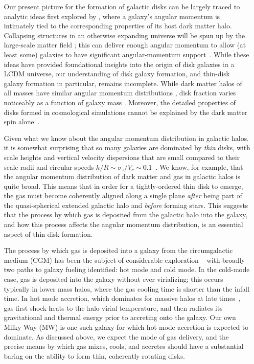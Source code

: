 \documentclass[fleqn,usenatbib]{mnras}
\begin{document}
Our present picture for the formation of galactic disks can be largely traced to analytic ideas first explored by \citet{fall1980}, where a galaxy's angular momentum is intimately tied to the corresponding properties of its host dark matter halo.
Collapsing structures in an otherwise expanding universe will be spun up by the large-scale matter field \citep{Peebles69};
this can deliver enough angular momentum to allow (at least some) galaxies to have significant angular-momentum support~\citep[e.g.][]{MMW98}. 
While these ideas have provided foundational insights into the origin of disk galaxies in a LCDM universe, our understanding of disk galaxy formation, and thin-disk galaxy formation in particular, remains incomplete.  While dark matter halos of all masses have similar angular momentum distributions \citep[e.g.][]{Barnes87}, disk fraction varies noticeably as a function of galaxy mass \citep[e.g.[]{Bernardi2010,Moffett16}. Moreover,  the detailed properties of disks formed in cosmological simulations cannot be explained by the dark matter spin alone~\citep[e.g.][]{Sales2012, GK18}.  

Given what we know about the angular momentum distribution in galactic halos, it is somewhat surprising that so many galaxies are dominated by {\em thin} disks, with  scale heights and vertical velocity dispersions that are small compared to their scale radii and circular speeds $h/R \sim \sigma_z/V_c \sim 0.1$~\citep[][]{Kregel2002}.
We know, for example, that the angular momentum distribution of dark matter \citep{Bullock2001} and gas \citep{Stewart2013,DeFelippis2020} in galactic halos is quite broad.
This means that in order for a tightly-ordered thin disk to emerge, the gas must become coherently aligned along a single plane \textit{after} being part of the quasi-spherical extended galactic halo and \textit{before} forming stars.
This suggests that the process by which gas is deposited from the galactic halo into the galaxy, and how this process affects the angular momentum distribution, is an essential aspect of thin disk formation.

The process by which gas is deposited into a galaxy from the circumgalactic medium (CGM) has been the subject of considerable exploration ~\citep[e.g.][]{Keres2005, Dekel2006, Keres2009, Angles-Alcazar2017, Martin2019a} with broadly two paths to galaxy fueling identified: hot mode and cold mode.
In the cold-mode case, gas is deposited into the galaxy without ever virializing; this occurs typically in lower mass halos, where the gas cooling time is shorter than the infall time.
In hot mode accretion, which dominates for massive halos at late times~\citep[e.g.][]{VandeVoort2011, VandeVoort2012a, Joung2012, Murante2012, Nelson2013}, gas first shock-heats to the halo virial temperature, and then radiates its gravitational and thermal energy prior to accreting onto the galaxy.
Our own Milky Way (MW) is one such galaxy for which hot mode accretion is expected to dominate.
As discussed above, we expect the mode of gas delivery, and the precise means by which gas mixes, cools, and accretes should have a substantial baring on the ability to form thin, coherently rotating disks.  
\end{document}
